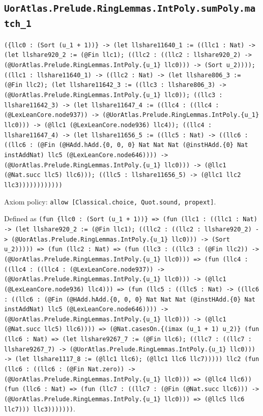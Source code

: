 \documentclass[11pt]{article}
\begin{document}
\subsection*{\texttt{UorAtlas.Prelude.RingLemmas.IntPoly.sumPoly.match\_1}}
\noindent\texttt{(\{llc0 : (Sort (u\_1 + 1))\} -> (let llshare11640\_1 := ((llc1 : Nat) -> (let llshare920\_2 := (@Fin llc1); ((llc2 : ((llc2 : llshare920\_2) -> (@UorAtlas.Prelude.RingLemmas.IntPoly.\{u\_1\} llc0))) -> (Sort u\_2)))); ((llc1 : llshare11640\_1) -> ((llc2 : Nat) -> (let llshare806\_3 := (@Fin llc2); (let llshare11642\_3 := ((llc3 : llshare806\_3) -> (@UorAtlas.Prelude.RingLemmas.IntPoly.\{u\_1\} llc0)); ((llc3 : llshare11642\_3) -> (let llshare11647\_4 := ((llc4 : ((llc4 : (@LexLeanCore.node937)) -> (@UorAtlas.Prelude.RingLemmas.IntPoly.\{u\_1\} llc0))) -> (@llc1 (@LexLeanCore.node936) llc4)); ((llc4 : llshare11647\_4) -> (let llshare11656\_5 := ((llc5 : Nat) -> ((llc6 : ((llc6 : (@Fin (@HAdd.hAdd.\{0, 0, 0\} Nat Nat Nat (@instHAdd.\{0\} Nat instAddNat) llc5 (@LexLeanCore.node646)))) -> (@UorAtlas.Prelude.RingLemmas.IntPoly.\{u\_1\} llc0))) -> (@llc1 (@Nat.succ llc5) llc6))); ((llc5 : llshare11656\_5) -> (@llc1 llc2 llc3))))))))))))}\par
\noindent Axiom policy: \texttt{allow [Classical.choice, Quot.sound, propext]}.\par
\noindent Defined as \texttt{(fun \{llc0 : (Sort (u\_1 + 1))\} => (fun (llc1 : ((llc1 : Nat) -> (let llshare920\_2 := (@Fin llc1); ((llc2 : ((llc2 : llshare920\_2) -> (@UorAtlas.Prelude.RingLemmas.IntPoly.\{u\_1\} llc0))) -> (Sort u\_2))))) => (fun (llc2 : Nat) => (fun (llc3 : ((llc3 : (@Fin llc2)) -> (@UorAtlas.Prelude.RingLemmas.IntPoly.\{u\_1\} llc0))) => (fun (llc4 : ((llc4 : ((llc4 : (@LexLeanCore.node937)) -> (@UorAtlas.Prelude.RingLemmas.IntPoly.\{u\_1\} llc0))) -> (@llc1 (@LexLeanCore.node936) llc4))) => (fun (llc5 : ((llc5 : Nat) -> ((llc6 : ((llc6 : (@Fin (@HAdd.hAdd.\{0, 0, 0\} Nat Nat Nat (@instHAdd.\{0\} Nat instAddNat) llc5 (@LexLeanCore.node646)))) -> (@UorAtlas.Prelude.RingLemmas.IntPoly.\{u\_1\} llc0))) -> (@llc1 (@Nat.succ llc5) llc6)))) => (@Nat.casesOn.\{(imax (u\_1 + 1) u\_2)\} (fun (llc6 : Nat) => (let llshare9267\_7 := (@Fin llc6); ((llc7 : ((llc7 : llshare9267\_7) -> (@UorAtlas.Prelude.RingLemmas.IntPoly.\{u\_1\} llc0))) -> (let llshare1117\_8 := (@llc1 llc6); (@llc1 llc6 llc7))))) llc2 (fun (llc6 : ((llc6 : (@Fin Nat.zero)) -> (@UorAtlas.Prelude.RingLemmas.IntPoly.\{u\_1\} llc0))) => (@llc4 llc6)) (fun (llc6 : Nat) => (fun (llc7 : ((llc7 : (@Fin (@Nat.succ llc6))) -> (@UorAtlas.Prelude.RingLemmas.IntPoly.\{u\_1\} llc0))) => (@llc5 llc6 llc7))) llc3)))))))}.\par
\end{document}
